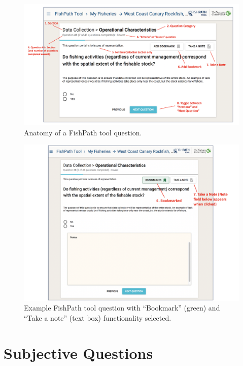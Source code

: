 \documentclass[11pt,]{book}
\begin{document}
\begin{figure}
 
 {\centering \includegraphics[width=0.95\linewidth]{images/question-anatomy} 
 
 }
 
 \caption{Anatomy of a FishPath tool question.}\label{fig:question-anatomy}
 \end{figure}

\begin{figure}
 
 {\centering \includegraphics[width=0.95\linewidth]{images/bookmark-notes} 
 
 }
 
 \caption{Example FishPath tool question with “Bookmark” (green) and “Take a note” (text box) functionality selected.}\label{fig:bookmark-notes}
 \end{figure}

\hypertarget{subjective-questions}{%
\section{Subjective Questions}\label{subjective-questions}}
\end{document}
